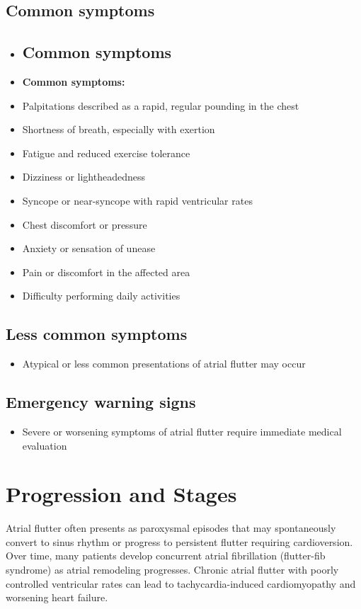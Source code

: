\subsection{Common symptoms}
\begin{itemize}[noitemsep]
  \item \subsection{Common symptoms}
  \item \textbf{Common symptoms:}
  \item Palpitations described as a rapid, regular pounding in the chest
  \item Shortness of breath, especially with exertion
  \item Fatigue and reduced exercise tolerance
  \item Dizziness or lightheadedness
  \item Syncope or near-syncope with rapid ventricular rates
  \item Chest discomfort or pressure
  \item Anxiety or sensation of unease
  \item Pain or discomfort in the affected area
  \item Difficulty performing daily activities
\end{itemize}

\subsection{Less common symptoms}
\begin{itemize}[noitemsep]
  \item Atypical or less common presentations of atrial flutter may occur
\end{itemize}

\subsection{Emergency warning signs}
\begin{itemize}[noitemsep]
  \item Severe or worsening symptoms of atrial flutter require immediate medical evaluation
\end{itemize}
\section{Progression and Stages}
Atrial flutter often presents as paroxysmal episodes that may spontaneously convert to sinus rhythm or progress to persistent flutter requiring cardioversion. Over time, many patients develop concurrent atrial fibrillation (flutter-fib syndrome) as atrial remodeling progresses. Chronic atrial flutter with poorly controlled ventricular rates can lead to tachycardia-induced cardiomyopathy and worsening heart failure.

